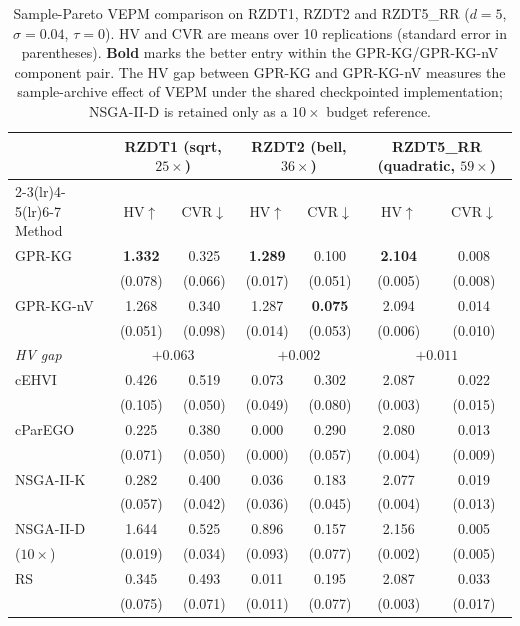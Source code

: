 \documentclass[12pt]{article}
\theoremstyle{plain}
\theoremstyle{definition}
\theoremstyle{remark}
\begin{document}
\begin{table}[t]
\centering
\caption{Sample-Pareto VEPM comparison on RZDT1, RZDT2 and RZDT5\_RR ($d=5$,
$\sigma=0.04$, $\tau=0$).  HV and CVR are means over 10 replications
(standard error in parentheses).  \textbf{Bold} marks the better entry
within the GPR-KG/GPR-KG-nV component pair.  The HV gap between
GPR-KG and GPR-KG-nV measures the sample-archive effect of VEPM under
the shared checkpointed implementation; NSGA-II-D is retained only as a
$10\times$ budget reference.}
\label{tab:noise}
\small
\setlength{\tabcolsep}{3.5pt}
\begin{tabular}{l cc cc cc}
\toprule
 & \multicolumn{2}{c}{RZDT1 (sqrt, $25\times$)}
 & \multicolumn{2}{c}{RZDT2 (bell, $36\times$)}
 & \multicolumn{2}{c}{RZDT5\_RR (quadratic, $59\times$)} \\
\cmidrule(lr){2-3}\cmidrule(lr){4-5}\cmidrule(lr){6-7}
Method & HV$\uparrow$ & CVR$\downarrow$
       & HV$\uparrow$ & CVR$\downarrow$
       & HV$\uparrow$ & CVR$\downarrow$ \\
\midrule
GPR-KG    & \textbf{1.332} & 0.325
          & \textbf{1.289} & 0.100
          & \textbf{2.104} & 0.008 \\
          & (0.078) & (0.066) & (0.017) & (0.051) & (0.005) & (0.008) \\[2pt]
GPR-KG-nV & 1.268 & 0.340
          & 1.287 & \textbf{0.075}
          & 2.094 & 0.014 \\
          & (0.051) & (0.098) & (0.014) & (0.053) & (0.006) & (0.010) \\[2pt]
\emph{HV gap} & \multicolumn{2}{c}{$+0.063$}
              & \multicolumn{2}{c}{$+0.002$}
              & \multicolumn{2}{c}{$+0.011$} \\[4pt]
cEHVI     & 0.426 & 0.519
          & 0.073 & 0.302
          & 2.087 & 0.022 \\
          & (0.105) & (0.050) & (0.049) & (0.080) & (0.003) & (0.015) \\[2pt]
cParEGO   & 0.225 & 0.380
          & 0.000 & 0.290
          & 2.080 & 0.013 \\
          & (0.071) & (0.050) & (0.000) & (0.057) & (0.004) & (0.009) \\[2pt]
NSGA-II-K & 0.282 & 0.400
          & 0.036 & 0.183
          & 2.077 & 0.019 \\
          & (0.057) & (0.042) & (0.036) & (0.045) & (0.004) & (0.013) \\[2pt]
\midrule
NSGA-II-D & 1.644 & 0.525
          & 0.896 & 0.157
          & 2.156 & 0.005 \\
 ($10\times$) & (0.019) & (0.034) & (0.093) & (0.077) & (0.002) & (0.005) \\[2pt]
\midrule
RS        & 0.345 & 0.493
          & 0.011 & 0.195
          & 2.087 & 0.033 \\
          & (0.075) & (0.071) & (0.011) & (0.077) & (0.003) & (0.017) \\
\bottomrule
\end{tabular}
\end{table}
\end{document}
